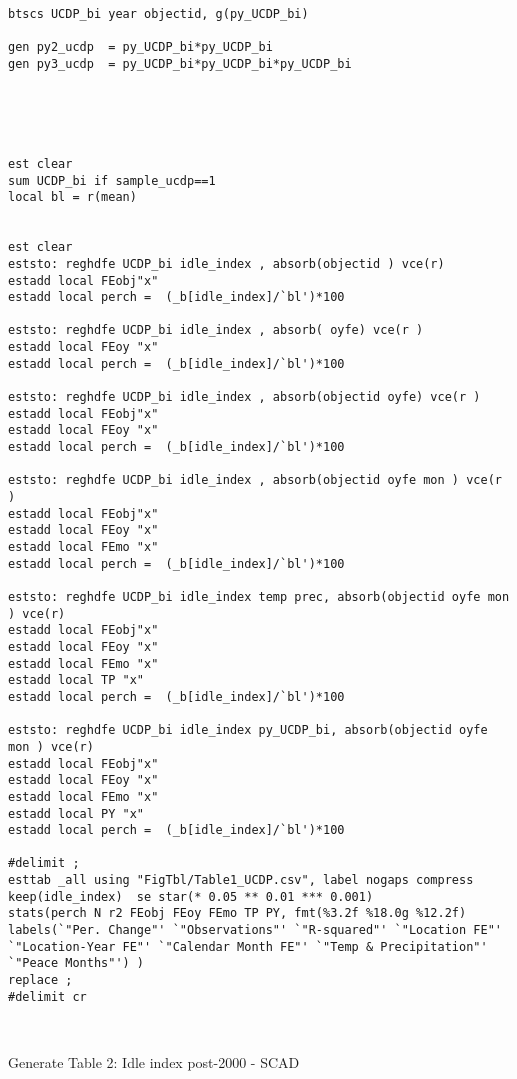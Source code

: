 \documentclass[12pt,letterpaper]{article}
\begin{document}
\begin{lstlisting}
btscs UCDP_bi year objectid, g(py_UCDP_bi)

gen py2_ucdp  = py_UCDP_bi*py_UCDP_bi
gen py3_ucdp  = py_UCDP_bi*py_UCDP_bi*py_UCDP_bi





est clear 
sum UCDP_bi if sample_ucdp==1 
local bl = r(mean) 


est clear
eststo: reghdfe UCDP_bi idle_index , absorb(objectid ) vce(r)  
estadd local FEobj"x"
estadd local perch =  (_b[idle_index]/`bl')*100

eststo: reghdfe UCDP_bi idle_index , absorb( oyfe) vce(r )  
estadd local FEoy "x"
estadd local perch =  (_b[idle_index]/`bl')*100

eststo: reghdfe UCDP_bi idle_index , absorb(objectid oyfe) vce(r )  
estadd local FEobj"x"
estadd local FEoy "x"
estadd local perch =  (_b[idle_index]/`bl')*100

eststo: reghdfe UCDP_bi idle_index , absorb(objectid oyfe mon ) vce(r )  
estadd local FEobj"x"
estadd local FEoy "x"
estadd local FEmo "x"
estadd local perch =  (_b[idle_index]/`bl')*100

eststo: reghdfe UCDP_bi idle_index temp prec, absorb(objectid oyfe mon ) vce(r)  
estadd local FEobj"x"
estadd local FEoy "x"
estadd local FEmo "x"
estadd local TP "x"
estadd local perch =  (_b[idle_index]/`bl')*100

eststo: reghdfe UCDP_bi idle_index py_UCDP_bi, absorb(objectid oyfe mon ) vce(r)  
estadd local FEobj"x"
estadd local FEoy "x"
estadd local FEmo "x"
estadd local PY "x"
estadd local perch =  (_b[idle_index]/`bl')*100

#delimit ; 
esttab _all using "FigTbl/Table1_UCDP.csv", label nogaps compress 
keep(idle_index)  se star(* 0.05 ** 0.01 *** 0.001) 
stats(perch N r2 FEobj FEoy FEmo TP PY, fmt(%3.2f %18.0g %12.2f) labels(`"Per. Change"' `"Observations"' `"R-squared"' `"Location FE"' `"Location-Year FE"' `"Calendar Month FE"' `"Temp & Precipitation"' `"Peace Months"') )
replace ; 
#delimit cr 

	
\end{lstlisting}

Generate Table 2: Idle index post-2000 - SCAD
\end{document}

